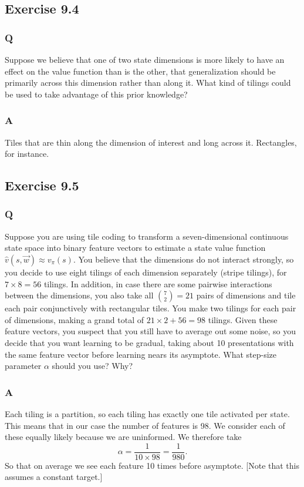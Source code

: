 \subsection{Exercise 9.4}
\subsubsection*{Q}
Suppose we believe that one of two state dimensions is more likely to have an effect on the value function than is the other, that generalization should be primarily across this dimension rather than along it. What kind of tilings could be used to take advantage of this prior knowledge?
\subsubsection*{A}
Tiles that are thin along the dimension of interest and long across it. Rectangles, for instance.

\subsection{Exercise 9.5}
\subsubsection*{Q}
Suppose you are using tile coding to transform a seven-dimensional continuous state space into binary feature vectors to estimate a state value function $\hat{v}(s, \vec{w}) \approx v_\pi(s)$. You believe that the dimensions do not interact strongly, so you decide to use eight tilings of each dimension separately (stripe tilings), for $7 \times 8 = 56$ tilings. In addition, in case there are some pairwise interactions between the dimensions, you also take all $\binom{7}{2} = 21$ pairs of dimensions and tile each pair conjunctively with rectangular tiles. You make two tilings for each pair of dimensions, making a grand total of $21 \times 2 + 56 = 98$ tilings. Given these feature vectors, you suspect that you still have to average out some noise, so you decide that you want learning to be gradual, taking about 10 presentations with the same feature vector before learning nears its asymptote. What step-size parameter $\alpha$ should you use? Why?

\subsubsection*{A}
Each tiling is a partition, so each tiling has exactly one tile activated per state. This means that in our case the number of features is 98. We consider each of these equally likely because we are uninformed. We therefore take
\[
\alpha = \frac{1}{10 \times 98} = \frac{1}{980}.
\]
So that on average we see each feature 10 times before asymptote. [Note that this assumes a constant target.]
